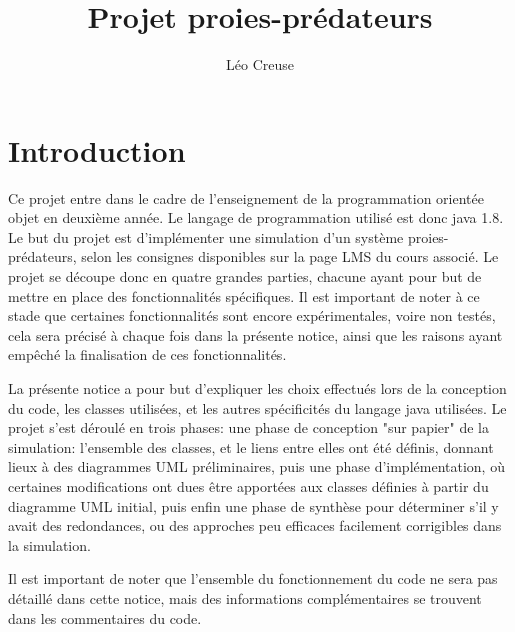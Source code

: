 \documentclass[12pt,a4paper,titlepage]{article}
\title{Projet proies-prédateurs}
\author{Léo Creuse}
\begin{document}
\maketitle
\tableofcontents
\pagebreak
\section{Introduction}
Ce projet entre dans le cadre de l'enseignement de la programmation orientée objet en deuxième année. Le 
langage de programmation utilisé est donc java 1.8. Le but du projet est d'implémenter une simulation d'un 
système proies-prédateurs, selon les consignes disponibles sur la page LMS du cours associé. Le projet se 
découpe donc en quatre grandes parties, chacune ayant pour but de mettre en place des fonctionnalités 
spécifiques. Il est important de noter à ce stade que certaines fonctionnalités sont encore expérimentales, 
voire non testés, cela sera précisé à chaque fois dans la présente notice, ainsi que les raisons ayant empêché 
la finalisation de ces fonctionnalités.
 

La présente notice a pour but d'expliquer les choix effectués lors de la conception du code, les classes 
utilisées, et les autres spécificités du langage java utilisées. Le projet s'est déroulé en trois phases: une 
phase de conception "sur papier" de la simulation: l'ensemble des classes, et le liens entre elles ont été 
définis, donnant lieux à des diagrammes UML préliminaires, puis une phase d'implémentation, où certaines 
modifications ont dues être apportées aux classes définies à partir du diagramme UML initial, puis enfin une 
phase de synthèse pour déterminer s'il y avait des redondances, ou des approches peu efficaces facilement 
corrigibles dans la simulation.


Il est important de noter que l'ensemble du fonctionnement du code ne sera pas détaillé dans cette notice, 
mais des informations complémentaires se trouvent dans les commentaires du code.
\end{document}
